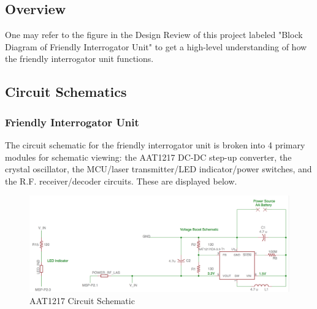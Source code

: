 \documentclass[letterpaper,10pt]{article}
\begin{document}
\begin{spacing}{1.15}
\subsection{Overview} \label{section-friendly-interrogator-design}
One may refer to the figure in the Design Review of this project labeled "Block Diagram of Friendly Interrogator Unit" to get a high-level understanding of how the friendly interrogator unit functions. 

\subsection{Circuit Schematics} \label{section-circuit-schematics}

\subsubsection{Friendly Interrogator Unit}
The circuit schematic for the friendly interrogator unit is broken into 4 primary modules for schematic viewing: the AAT1217 DC-DC step-up converter, the crystal oscillator, the MCU/laser transmitter/LED indicator/power switches, and the R.F. receiver/decoder circuits. These are displayed below.
\begin{figure} [H]
	\centering
	\includegraphics[scale=0.35]{converter-schematic.png}
	\caption{AAT1217 Circuit Schematic\label{fig:voltage-converter-schematic}}
\end{figure}


\end{spacing}
\end{document}
